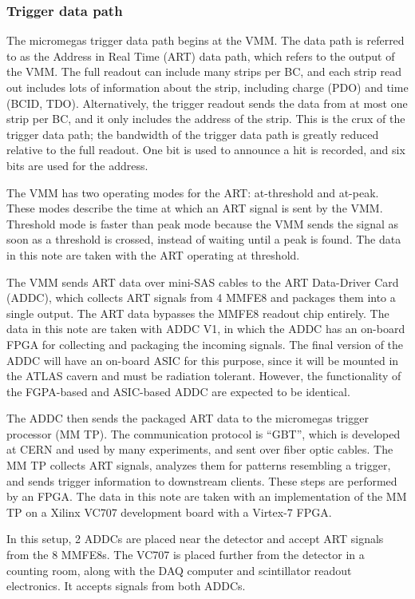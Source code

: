 \subsubsection{Trigger data path}
\label{sec:exp-art}

The micromegas trigger data path begins at the VMM. The data path is referred to as the Address in Real Time (ART) data path, which refers to the output of the VMM. The full readout can include many strips per BC, and each strip read out includes lots of information about the strip, including charge (PDO) and time (BCID, TDO). Alternatively, the trigger readout sends the data from at most one strip per BC, and it only includes the address of the strip. This is the crux of the trigger data path; the bandwidth of the trigger data path is greatly reduced relative to the full readout. One bit is used to announce a hit is recorded, and six bits are used for the address.

The VMM has two operating modes for the ART: at-threshold and at-peak. These modes describe the time at which an ART signal is sent by the VMM. Threshold mode is faster than peak mode because the VMM sends the signal as soon as a threshold is crossed, instead of waiting until a peak is found. The data in this note are taken with the ART operating at threshold.

The VMM sends ART data over mini-SAS cables to the ART Data-Driver Card (ADDC), which collects ART signals from 4 MMFE8 and packages them into a single output. The ART data bypasses the MMFE8 readout chip entirely. The data in this note are taken with ADDC V1, in which the ADDC has an on-board FPGA for collecting and packaging the incoming signals. The final version of the ADDC will have an on-board ASIC for this purpose, since it will be mounted in the ATLAS cavern and must be radiation tolerant. However, the functionality of the FGPA-based and ASIC-based ADDC are expected to be identical.

The ADDC then sends the packaged ART data to the micromegas trigger processor (MM TP). The communication protocol is ``GBT'', which is developed at CERN and used by many experiments, and sent over fiber optic cables. The MM TP collects ART signals, analyzes them for patterns resembling a trigger, and sends trigger information to downstream clients. These steps are performed by an FPGA. The data in this note are taken with an implementation of the MM TP on a Xilinx VC707 development board with a Virtex-7 FPGA.

In this setup, 2 ADDCs are placed near the detector and accept ART signals from the 8 MMFE8s. The VC707 is placed further from the detector in a counting room, along with the DAQ computer and scintillator readout electronics. It accepts signals from both ADDCs.

